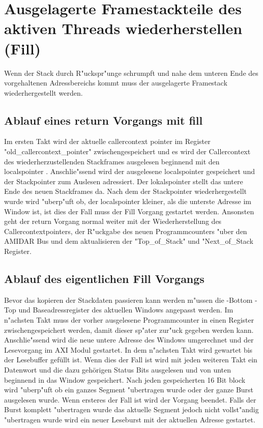 \section{Ausgelagerte Framestackteile des aktiven Threads wiederherstellen (Fill)}
Wenn der Stack durch R"uckspr"unge schrumpft und nahe dem unteren Ende des vorgehaltenen Adressbereichs kommt muss der ausgelagerte Framestack wiederhergestellt werden. 

\subsection{Ablauf eines return Vorgangs mit fill}
Im ersten Takt wird der aktuelle callercontext pointer im Register "old\_callercontext\_pointer" zwischengespeichert und es wird der Callercontext des wiederherzustellenden Stackframes ausgelesen beginnend mit den localspointer . 
Anschlie{"ss}end wird der ausgelesene localspointer gespeichert und der Stackpointer zum Auslesen adressiert. Der lokalspointer stellt das untere Ende des neuen Stackframes da. Nach dem der Stackpointer wiederhergestellt wurde wird "uberp"uft ob, der localspointer kleiner, als die unterste Adresse im Window ist, ist dies der Fall muss der Fill Vorgang gestartet werden.  
Ansonsten geht der return Vorgang normal weiter mit der Wiederherstellung des Callercontextpointers, der R"uckgabe des neuen Programmcounters "uber den AMIDAR Bus und dem aktualisieren der "Top\_of\_Stack" und "Next\_of\_Stack Register. 

\subsection {Ablauf des eigentlichen Fill Vorgangs}

Bevor das kopieren der Stackdaten passieren kann werden m"ussen die -Bottom -Top und Baseadressregister des aktuellen Windows angepasst werden. Im n"achsten Takt muss der vorher ausgelesene Programmcounter in einen Register zwischengespeichert werden, damit dieser sp"ater zur"uck gegeben werden kann. Anschlie{"ss}end wird die neue untere Adresse des Windows umgerechnet und der Lesevorgang im AXI Modul gestartet. In dem n"achsten Takt wird gewartet bis der Lesebuffer gefüllt ist. Wenn dies der Fall ist wird mit jeden weiteren Takt ein Datenwort und die dazu gehörigen Status Bits ausgelesen und von unten beginnend in das Window gespeichert. Nach jeden gespeicherten 16 Bit block wird "uberp"uft ob ein ganzes Segment "ubertragen wurde oder der ganze Burst ausgelesen wurde. Wenn ersteres der Fall ist wird der Vorgang beendet. Falls der Burst komplett "ubertragen wurde das aktuelle Segment jedoch nicht vollst"andig "ubertragen wurde wird ein neuer Leseburst mit der aktuellen Adresse gestartet. 


